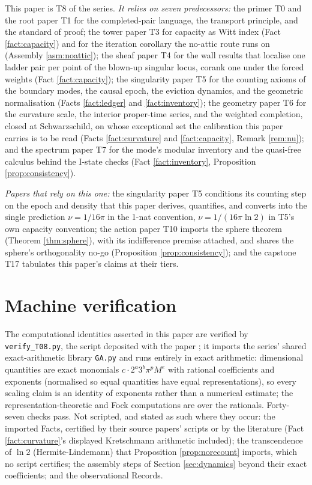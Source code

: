 \documentclass[11pt]{article}
\theoremstyle{definition}
\begin{document}
This paper is T8 of the series. \emph{It relies on seven predecessors:} the primer T0 \cite{ButlerT0} and the root paper T1 \cite{ButlerT1} for the completed-pair language, the transport principle, and the standard of proof; the tower paper T3 \cite{ButlerT3} for capacity as Witt index (Fact \ref{fact:capacity}) and for the iteration corollary the no-attic route runs on (Assembly \ref{asm:noattic}); the sheaf paper T4 \cite{ButlerT4} for the wall results that localise one ladder pair per point of the blown-up singular locus, corank one under the forced weights (Fact \ref{fact:capacity}); the singularity paper T5 \cite{ButlerT5} for the counting axioms of the boundary modes, the causal epoch, the eviction dynamics, and the geometric normalisation (Facts \ref{fact:ledger} and \ref{fact:inventory}); the geometry paper T6 \cite{ButlerT6} for the curvature scale, the interior proper-time series, and the weighted completion, closed at Schwarzschild, on whose exceptional set the calibration this paper carries is to be read (Facts \ref{fact:curvature} and \ref{fact:capacity}, Remark \ref{rem:nu}); and the spectrum paper T7 \cite{ButlerT7} for the mode's modular inventory and the quasi-free calculus behind the I-state checks (Fact \ref{fact:inventory}, Proposition \ref{prop:consistency}).

\emph{Papers that rely on this one:} the singularity paper T5 \cite{ButlerT5} conditions its counting step on the epoch and density that this paper derives, quantifies, and converts into the single prediction $\nu = 1/16\pi$ in the 1-nat convention, $\nu = 1/(16\pi\ln 2)$ in T5's own capacity convention; the action paper T10 \cite{ButlerT10} imports the sphere theorem (Theorem \ref{thm:sphere}), with its indifference premise attached, and shares the sphere's orthogonality no-go (Proposition \ref{prop:consistency}); and the capstone T17 \cite{ButlerT17} tabulates this paper's claims at their tiers.

\section{Machine verification}\label{sec:verification}

The computational identities asserted in this paper are verified by \texttt{verify\_T08.py}, the script deposited with the paper \cite{ButlerVerifyT8}; it imports the series' shared exact-arithmetic library \texttt{GA.py} and runs entirely in exact arithmetic: dimensional quantities are exact monomials $c\cdot 2^a 3^b \pi^p M^e$ with rational coefficients and exponents (normalised so equal quantities have equal representations), so every scaling claim is an identity of exponents rather than a numerical estimate; the representation-theoretic and Fock computations are over the rationals. Forty-seven checks pass. Not scripted, and stated as such where they occur: the imported Facts, certified by their source papers' scripts or by the literature (Fact \ref{fact:curvature}'s displayed Kretschmann arithmetic included); the transcendence of $\ln 2$ (Hermite-Lindemann) that Proposition \ref{prop:norecount} imports, which no script certifies; the assembly steps of Section \ref{sec:dynamics} beyond their exact coefficients; and the observational Records.
\end{document}
